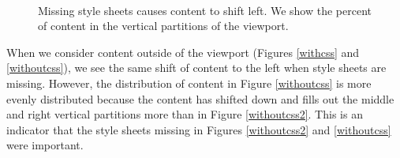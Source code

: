\begin{figure}[h!]
  \begin{center}
    \\
  \end{center}
  \label{pilotexample2}
  \caption{Missing style sheets causes content to shift left. We show the percent of content in the vertical partitions of the viewport.}
\end{figure}

When we consider content outside of the viewport (Figures \ref{withcss} and \ref{withoutcss}), we see the same shift of content to the left when style sheets are missing. However, the distribution of content in Figure \ref{withoutcss} is more evenly distributed because the content has shifted down and fills out the middle and right vertical partitions more than in Figure \ref{withoutcss2}. This is an indicator that the style sheets missing in Figures \ref{withoutcss2} and \ref{withoutcss} were important.

